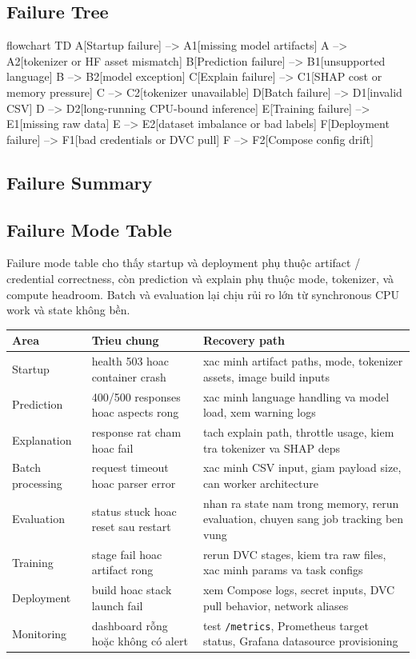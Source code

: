 \subsection{Failure Tree}
\begin{mermaidblock}
flowchart TD
  A[Startup failure] --> A1[missing model artifacts]
  A --> A2[tokenizer or HF asset mismatch]
  B[Prediction failure] --> B1[unsupported language]
  B --> B2[model exception]
  C[Explain failure] --> C1[SHAP cost or memory pressure]
  C --> C2[tokenizer unavailable]
  D[Batch failure] --> D1[invalid CSV]
  D --> D2[long-running CPU-bound inference]
  E[Training failure] --> E1[missing raw data]
  E --> E2[dataset imbalance or bad labels]
  F[Deployment failure] --> F1[bad credentials or DVC pull]
  F --> F2[Compose config drift]
\end{mermaidblock}

\subsection{Failure Summary}
\subsection{Failure Mode Table}
Failure mode table cho thấy startup và deployment phụ thuộc artifact / credential correctness, còn prediction và explain phụ thuộc mode, tokenizer, và compute headroom. Batch và evaluation lại chịu rủi ro lớn từ synchronous CPU work và state không bền.

\begin{table}[H]
\centering
\begin{tabularx}{\textwidth}{@{}l l X@{}}
\toprule
\textbf{Area} & \textbf{Trieu chung} & \textbf{Recovery path} \\
\midrule
Startup & health 503 hoac container crash & xac minh artifact paths, mode, tokenizer assets, image build inputs \\
Prediction & 400/500 responses hoac aspects rong & xac minh language handling va model load, xem warning logs \\
Explanation & response rat cham hoac fail & tach explain path, throttle usage, kiem tra tokenizer va SHAP deps \\
Batch processing & request timeout hoac parser error & xac minh CSV input, giam payload size, can worker architecture \\
Evaluation & status stuck hoac reset sau restart & nhan ra state nam trong memory, rerun evaluation, chuyen sang job tracking ben vung \\
Training & stage fail hoac artifact rong & rerun DVC stages, kiem tra raw files, xac minh params va task configs \\
Deployment & build hoac stack launch fail & xem Compose logs, secret inputs, DVC pull behavior, network aliases \\
Monitoring & dashboard rỗng hoặc không có alert & test \texttt{/metrics}, Prometheus target status, Grafana datasource provisioning \\
\bottomrule
\end{tabularx}
\end{table}

